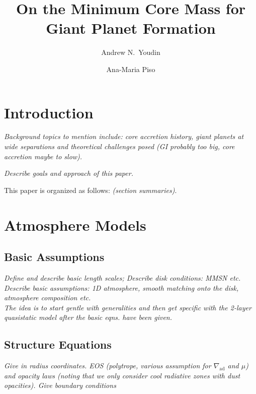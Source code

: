 \documentclass[apj]{emulateapj}
\newcommand{\emgr}[1]{\emph{ \color{gray} #1}}
\begin{document}



\title{On the Minimum Core Mass for Giant Planet Formation}
\author{Andrew N.\ Youdin}

\author{Ana-Maria Piso}


\section{Introduction}
\emgr{Background topics to mention include: core accretion history, giant planets at wide separations and theoretical challenges posed (GI probably too big, core accretion maybe to slow).}

\emgr{Describe goals and approach of this paper.}

This paper is organized as follows: \emgr{(section summaries)}.


\section{Atmosphere Models}\label{sec:model}

\subsection{Basic Assumptions}
\emgr{ Define and describe basic length scales; Describe disk conditions: MMSN etc. Describe basic assumptions: 1D atmosphere, smooth matching onto the disk, atmosphere composition etc.  \\
The idea is to start gentle with generalities and then get specific with the 2-layer quasistatic model after the basic eqns. have been given.}


\subsection{Structure Equations}
\emgr{Give in radius coordinates. EOS (polytrope, various assumption for $\nabla_{\mathrm{ad}}$ and $\mu$) and opacity laws (noting that we only consider cool radiative zones with dust opacities). Give boundary conditions}
\end{document}
